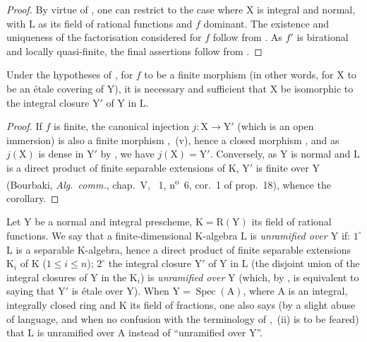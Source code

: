 \begin{proof}
By virtue of , one can restrict to the case where $\mathrm{X}$ is integral and normal, with $\mathrm{L}$ as its field of rational functions and $f$ dominant.
The existence and uniqueness of the factorisation considered for $f$ follow from .
As $f'$ is birational and locally quasi-finite, the final assertions follow from .
\end{proof}

\begin{corollary}[18.10.9]
\label{IV.18.10.9}
Under the hypotheses of , for $f$ to be a finite morphism (in other words, for $\mathrm{X}$ to be an \'etale covering of $\mathrm{Y}$), it is necessary and sufficient that $\mathrm{X}$ be isomorphic to the integral closure $\mathrm{Y}'$ of $\mathrm{Y}$ in $\mathrm{L}$.
\end{corollary}

\begin{proof}
If $f$ is finite, the canonical injection $j:\mathrm{X}\to\mathrm{Y}'$ (which is an open immersion) is also a finite morphism ,~(v), hence a closed morphism , and as $j(\mathrm{X})$ is dense in $\mathrm{Y}'$ by , we have $j(\mathrm{X})=\mathrm{Y}'$.
Conversely, as $\mathrm{Y}$ is normal and $\mathrm{L}$ is a direct product of finite separable extensions of $\mathrm{K}$, $\mathrm{Y}'$ is finite over $\mathrm{Y}$ (Bourbaki, \emph{Alg.\ comm.}, chap.~V, \textsection~1, n\textsuperscript{o}~6, cor.~1 of prop.~18), whence the corollary.
\end{proof}

\begin{env}[18.10.10]
\label{IV.18.10.10}
Let $\mathrm{Y}$ be a normal and integral prescheme, $\mathrm{K}=\mathrm{R}(\mathrm{Y})$ its field of rational functions.
We say that a finite-dimensional $\mathrm{K}$-algebra $\mathrm{L}$ is \emph{unramified over $\mathrm{Y}$} if: $1^{\circ}$ $\mathrm{L}$ is a separable $\mathrm{K}$-algebra, hence a direct product of finite separable extensions $\mathrm{K}_i$ of $\mathrm{K}$ ($1\leq i\leq n$); $2^{\circ}$ the integral closure $\mathrm{Y}'$ of $\mathrm{Y}$ in $\mathrm{L}$ (the disjoint union of the integral closures of $\mathrm{Y}$ in the $\mathrm{K}_i$) is \emph{unramified over} $\mathrm{Y}$ (which, by ,
is equivalent to saying that $\mathrm{Y}'$ is \'etale over $\mathrm{Y}$).
When $\mathrm{Y}=\operatorname{Spec}(\mathrm{A})$, where $\mathrm{A}$ is an integral, integrally closed ring and $\mathrm{K}$ its field of fractions, one also says (by a slight abuse of language, and when no confusion with the terminology of ,~(ii) is to be feared) that $\mathrm{L}$ is unramified over $\mathrm{A}$ instead of ``unramified over $\mathrm{Y}$''.
\end{env}

